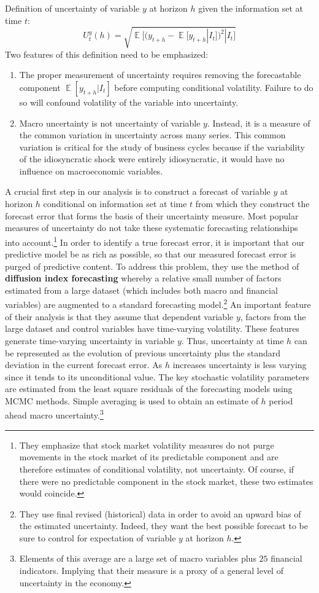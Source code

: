 \documentclass{article}
\DeclareMathOperator{\E}{\mathbb{E}}
\begin{document}
{Definition of uncertainty of variable $y$ at horizon $h$ given the information set at time $t$:
$$
U_t^y(h) = \sqrt{\E \big[  (y_{t+h} - \E[ y_{t+h}| I_t])^2 | I_t \big]}
$$
Two features of this definition need to be emphasized:
\begin{enumerate}
	\item The proper measurement of uncertainty requires removing the forecastable component $\E[y_{t+h}|I_t]$ before computing conditional volatility. Failure to do so will confound volatility of the variable into uncertainty.
	\item Macro uncertainty is not uncertainty of variable $y$. Instead, it is a measure of the common variation in uncertainty across many series. This common variation is critical for the study of business cycles because if the variability of the idiosyncratic shock were entirely idiosyncratic, it would have no influence on macroeconomic variables.
\end{enumerate}

A crucial first step in our analysis is to construct a forecast of variable $y$ at horizon $h$ conditional on information set at time $t$ from which they construct the forecast error that forms the basis of their uncertainty measure. Most popular measures of uncertainty do not take these systematic forecasting relationships into account.\footnote{They emphasize that stock market volatility measures do not purge movements in the stock market of its predictable component and are therefore estimates of conditional volatility, not uncertainty. Of course, if there were no predictable component in the stock market, these two estimates would coincide.} In order to identify a true forecast error, it is important that our predictive model be as rich as possible, so that our measured forecast error is purged of predictive content. To address this problem, they use the method of \textbf{diffusion index forecasting} whereby a relative small number of factors estimated from a large dataset (which includes both macro and financial variables) are augmented to a standard forecasting model.\footnote{They use final revised (historical) data in order to avoid an upward bias of the estimated uncertainty. Indeed, they want the best possible forecast to be sure to control for expectation of variable $y$ at horizon $h$.} An important feature of their analysis is that they assume that dependent variable $y$, factors from the large dataset and control variables have time-varying volatility. These features generate time-varying uncertainty in variable $y$. Thus, uncertainty at time $h$ can be represented as the evolution of previous uncertainty plus the standard deviation in the current forecast error. As $h$ increases uncertainty is less varying since it tends to its unconditional value. The key stochastic volatility parameters are estimated from the least square residuals of the forecasting models using MCMC methods. Simple averaging is used to obtain an estimate of $h$ period ahead macro uncertainty.\footnote{Elements of this average are a large set of macro variables plus $25$ financial indicators. Implying that their measure is a proxy of a general level of uncertainty in the economy.}

}
\end{document}
